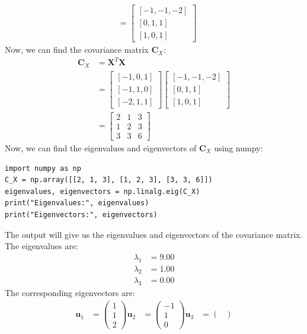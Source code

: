 \documentclass[a3paper,12pt]{extarticle} %
\begin{document}
\begin{enumerate}
\begin{align}
&= \begin{bmatrix} [-1, -1, -2] \\ [0, 1, 1] \\ [1, 0, 1] \end{bmatrix}
\end{align}
Now, we can find the covariance matrix $\mathbf{C}_X$:
\begin{align}
\mathbf{C}_X &=  \mathbf{X}^T \mathbf{X}\\
&=  \begin{bmatrix} [-1, 0, 1] \\ [-1, 1, 0] \\ [-2, 1, 1] \end{bmatrix} \begin{bmatrix} [-1, -1, -2] \\ [0, 1, 1] \\ [1, 0, 1] \end{bmatrix}\\
&= \begin{bmatrix} 2 & 1 & 3 \\ 1 & 2 & 3 \\ 3 & 3 & 6 \end{bmatrix}
\end{align}
Now, we can find the eigenvalues and eigenvectors of $\mathbf{C}_X$ using numpy:
\begin{verbatim}
import numpy as np
C_X = np.array([[2, 1, 3], [1, 2, 3], [3, 3, 6]])
eigenvalues, eigenvectors = np.linalg.eig(C_X)
print("Eigenvalues:", eigenvalues)
print("Eigenvectors:", eigenvectors)
\end{verbatim}
The output will give us the eigenvalues and eigenvectors of the covariance matrix. The eigenvalues are:
\begin{align}
\lambda_1 &= 9.00\\
\lambda_2 &= 1.00\\
\lambda_3 &= 0.00
\end{align}
The corresponding eigenvectors are:
\begin{align}
    \mathbf{u}_1  &= \begin{pmatrix}
    1\\
    1\\
    2
    \end{pmatrix}
    \mathbf{u}_2  &= \begin{pmatrix}
    -1\\
    1\\
    0
    \end{pmatrix}
    \mathbf{u}_3  &= \begin{pmatrix}

\end{pmatrix}
\end{align}
\end{enumerate}
\end{document}

